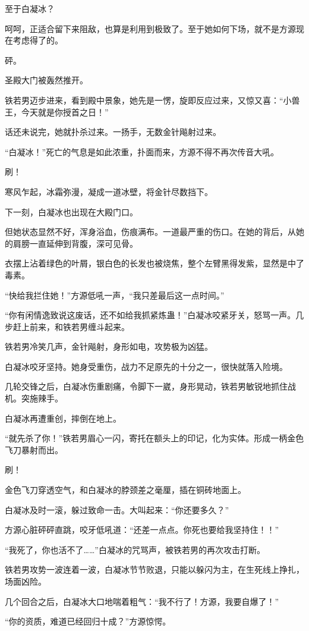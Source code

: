 \begin{this_body}
至于白凝冰？

呵呵，正适合留下来阻敌，也算是利用到极致了。至于她如何下场，就不是方源现在考虑得了的。

砰。

圣殿大门被轰然推开。

铁若男迈步进来，看到殿中景象，她先是一愣，旋即反应过来，又惊又喜：“小兽王，今天就是你授首之日！”

话还未说完，她就扑杀过来。一扬手，无数金针飚射过来。

“白凝冰！”死亡的气息是如此浓重，扑面而来，方源不得不再次传音大吼。

刷！

寒风乍起，冰霜弥漫，凝成一道冰壁，将金针尽数挡下。

下一刻，白凝冰也出现在大殿门口。

但她状态显然不好，浑身浴血，伤痕满布。一道最严重的伤口。在她的背后，从她的肩膀一直延伸到背腹，深可见骨。

衣摆上沾着绿色的叶屑，银白色的长发也被烧焦，整个左臂黑得发紫，显然是中了毒素。

“快给我拦住她！”方源低吼一声，“我只差最后这一点时间。”

“你有闲情逸致说这废话，还不如给我抓紧炼蛊！”白凝冰咬紧牙关，怒骂一声。几步赶上前来，和铁若男缠斗起来。

铁若男冷笑几声，金针飚射，身形如电，攻势极为凶猛。

白凝冰咬牙坚持。她身受重伤，战力不足原先的十分之一，很快就落入险境。

几轮交锋之后，白凝冰伤重剧痛，令脚下一崴，身形晃动，铁若男敏锐地抓住战机。突施辣手。

白凝冰再遭重创，摔倒在地上。

“就先杀了你！”铁若男眉心一闪，寄托在额头上的印记，化为实体。形成一柄金色飞刀暴射而出。

刷！

金色飞刀穿透空气，和白凝冰的脖颈差之毫厘，插在铜砖地面上。

白凝冰及时一滚，躲过致命一击。大叫起来：“你还要多久？”

方源心脏砰砰直跳，咬牙低吼道：“还差一点点。你死也要给我坚持住！！”

“我死了，你也活不了……”白凝冰的咒骂声，被铁若男的再次攻击打断。

铁若男攻势一波连着一波，白凝冰节节败退，只能以躲闪为主，在生死线上挣扎，场面凶险。

几个回合之后，白凝冰大口地喘着粗气：“我不行了！方源，我要自爆了！”

“你的资质，难道已经回归十成？”方源惊愕。


\end{this_body}

